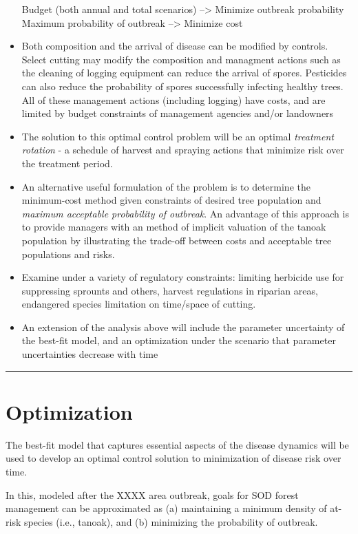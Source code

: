 \documentclass[english,nohyper,nofonts,nobib,nols,twoside]{tufte-handout}
\begin{document}
\begin{itemize}
  Budget (both annual and total scenarios) --\textgreater{} Minimize
  outbreak probability Maximum probability of outbreak --\textgreater{}
  Minimize cost
\item
  Both composition and the arrival of disease can be modified by
  controls. Select cutting may modify the composition and managment
  actions such as the cleaning of logging equipment can reduce the
  arrival of spores. Pesticides can also reduce the probability of
  spores successfully infecting healthy trees. All of these management
  actions (including logging) have costs, and are limited by budget
  constraints of management agencies and/or landowners
\item
  The solution to this optimal control problem will be an optimal
  \emph{treatment rotation} - a schedule of harvest and spraying actions
  that minimize risk over the treatment period.
\item
  An alternative useful formulation of the problem is to determine the
  minimum-cost method given constraints of desired tree population and
  \emph{maximum acceptable probability of outbreak}. An advantage of
  this approach is to provide managers with an method of implicit
  valuation of the tanoak population by illustrating the trade-off
  between costs and acceptable tree populations and risks.
\item
  Examine under a variety of regulatory constraints: limiting herbicide
  use for suppressing sprounts and others, harvest regulations in
  riparian areas, endangered species limitation on time/space of
  cutting.
\item
  An extension of the analysis above will include the parameter
  uncertainty of the best-fit model, and an optimization under the
  scenario that parameter uncertainties decrease with time
\end{itemize}

\begin{center}\rule{3in}{0.4pt}\end{center}

\section{Optimization}

The best-fit model that captures essential aspects of the disease
dynamics will be used to develop an optimal control solution to
minimization of disease risk over time.

In this, modeled after the XXXX area outbreak, goals for SOD forest
management can be approximated as (a) maintaining a minimum density of
at-risk species (i.e., tanoak), and (b) minimizing the probability of
outbreak.
\end{document}
